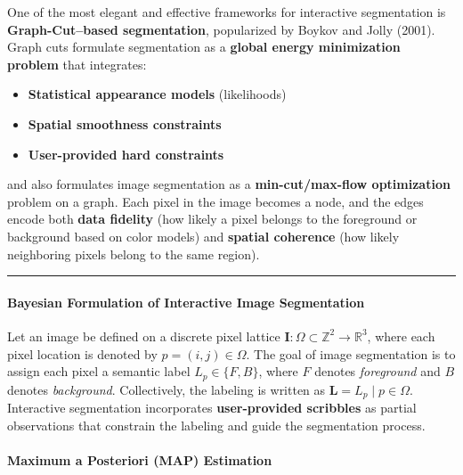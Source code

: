 \documentclass[11pt]{article}
\providecommand{\tightlist}{%
      \setlength{\itemsep}{0pt}\setlength{\parskip}{0pt}}
\begin{document}
One of the most elegant and effective frameworks for interactive
segmentation is \textbf{Graph-Cut--based segmentation}, popularized by
Boykov and Jolly (2001). Graph cuts formulate segmentation as a
\textbf{global energy minimization problem} that integrates:

\begin{itemize}
\tightlist
\item
  \textbf{Statistical appearance models} (likelihoods)
\item
  \textbf{Spatial smoothness constraints}
\item
  \textbf{User-provided hard constraints}
\end{itemize}

and also formulates image segmentation as a \textbf{min-cut/max-flow
optimization} problem on a graph. Each pixel in the image becomes a
node, and the edges encode both \textbf{data fidelity} (how likely a
pixel belongs to the foreground or background based on color models) and
\textbf{spatial coherence} (how likely neighboring pixels belong to the
same region).

\begin{center}\rule{0.5\linewidth}{0.5pt}\end{center}

\hypertarget{bayesian-formulation-of-interactive-image-segmentation}{%
\paragraph{\texorpdfstring{\textbf{Bayesian Formulation of Interactive
Image
Segmentation}}{Bayesian Formulation of Interactive Image Segmentation}}\label{bayesian-formulation-of-interactive-image-segmentation}}

Let an image be defined on a discrete pixel lattice
\(\mathbf{I} : \Omega \subset \mathbb{Z}^2 \rightarrow \mathbb{R}^3\),
where each pixel location is denoted by \(p = (i,j) \in \Omega\). The
goal of image segmentation is to assign each pixel a semantic label
\(L_p \in \{F, B\}\), where \(F\) denotes \emph{foreground} and \(B\)
denotes \emph{background}. Collectively, the labeling is written as
\(\mathbf{L} = {L_p \mid p \in \Omega}\). Interactive segmentation
incorporates \textbf{user-provided scribbles} as partial observations
that constrain the labeling and guide the segmentation process.

\hypertarget{maximum-a-posteriori-map-estimation}{%
\paragraph{\texorpdfstring{\textbf{Maximum a Posteriori (MAP)
Estimation}}{Maximum a Posteriori (MAP) Estimation}}\label{maximum-a-posteriori-map-estimation}}
\end{document}
